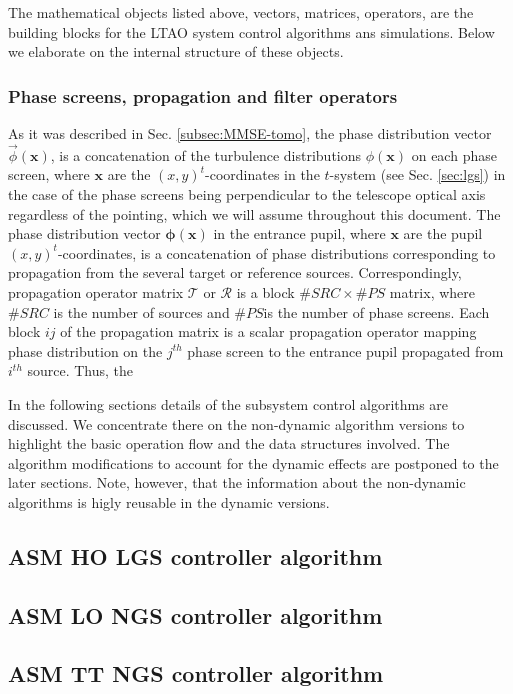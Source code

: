 The mathematical objects listed above, vectors, matrices, operators, are the
building blocks for the LTAO system control algorithms ans simulations. Below
we elaborate on the internal structure of these objects.

\subsubsection{Phase screens, propagation and filter operators}
\label{subsubsec:phase-and-propagation}

As it was described in Sec. \ref{subsec:MMSE-tomo}, the phase
distribution vector $\vec{\phi}(\bm{x})$, is a concatenation of the
turbulence distributions $\phi(\bm{x})$ on each phase screen,
where $\bm{x}$ are the $(x,y)^{t}$-coordinates in the $t$-system (see Sec.
\ref{sec:lgs}) in the case of the phase screens being perpendicular to
the telescope optical axis regardless of the pointing, which we will assume
throughout this document. The phase distribution vector
$\bm{\phi} (\bm{x})$ in the entrance pupil, where $\bm{x}$ are the
pupil $(x,y)^{t}$-coordinates, is a concatenation of phase distributions
corresponding to propagation from the several target or reference sources.
Correspondingly, propagation operator matrix $\mathcal{T}$ or $\mathcal{R}$ is
a block $\#SRC\times\#PS$ matrix, where $\#SRC$ is the number of sources and
$\#PS$is the number of phase screens. Each block $ij$ of the propagation matrix
is a scalar propagation operator mapping phase distribution on the $j^{th}$
phase screen to the entrance pupil propagated from $i^{th}$ source. Thus, the

In the following sections details of the subsystem control algorithms are
discussed. We concentrate there on the non-dynamic algorithm versions to
highlight the basic operation flow and the data structures involved. The
algorithm modifications to account for the dynamic effects are postponed to
the later sections. Note, however, that the information about the non-dynamic
algorithms is higly reusable in the dynamic versions.

\subsection{ASM HO LGS controller algorithm}
\subsection{ASM LO NGS controller algorithm}
\subsection{ASM TT NGS controller algorithm}
